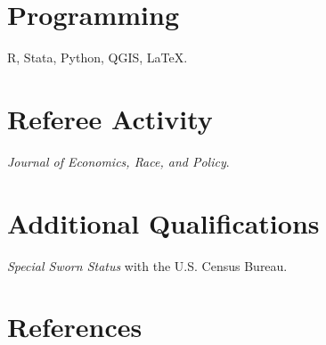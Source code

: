\documentclass[letterpaper]{article}
\begin{document}
\section*{Programming}
\vspace{2 mm}
{\makebox[2.3cm]{\hfill}}R, Stata, Python, QGIS, \LaTeX.
\vspace{2 mm}

\section*{Referee Activity}
\vspace{2 mm}
{\makebox[2.3cm]{\hfill}}\textit{Journal of Economics, Race, and Policy}.
\vspace{2 mm}

\section*{Additional Qualifications}
\vspace{2 mm}
{\makebox[2.3cm]{\hfill}}\textit{Special Sworn Status} with the U.S. Census Bureau.
\vspace{2 mm}



\section*{References}
\end{document}

